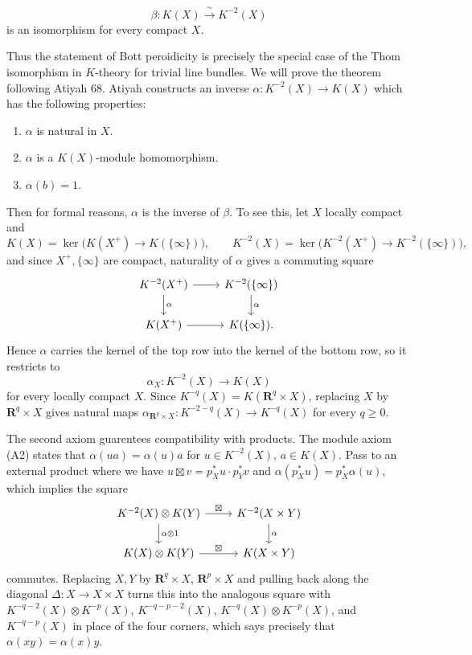 \documentclass[12pt]{article}
\begin{document}
\begin{theorem}
\[
\beta: K(X) \xrightarrow{\ \sim\ } K^{-2}(X)
\]
is an isomorphism for every compact $X$.
\end{theorem}
Thus the statement of Bott peroidicity is precisely the special case of the Thom isomorphism in $K$-theory for trivial line bundles. We will prove the theorem following Atiyah 68. Atiyah constructs an inverse $\alpha: K^{-2}(X) \to K(X)$ which has the following properties:
\begin{enumerate}
    \item $\alpha$ is natural in $X$.
    \item $\alpha$ is a $K(X)$-module homomorphism.
    \item $\alpha(b) = 1$.
\end{enumerate} Then for formal reasons, $\alpha$ is the inverse of $\beta$. To see this, let $X$ locally compact and
\[
K(X)=\ker\big(K(X^+)\to K(\{\infty\})\big),
\qquad
K^{-2}(X)=\ker\big(K^{-2}(X^+)\to K^{-2}(\{\infty\})\big),
\]
and since $X^+,\{\infty\}$ are compact, naturality of $\alpha$ gives a commuting square
\[
\begin{tikzcd}
K^{-2}(X^+) \arrow[r] \arrow[d,"\alpha"] & K^{-2}(\{\infty\}) \arrow[d,"\alpha"] \\
K(X^+) \arrow[r] & K(\{\infty\}).
\end{tikzcd}
\]
Hence $\alpha$ carries the kernel of the top row into the kernel of the bottom row, so it
restricts to
\[
\alpha_X: K^{-2}(X)\longrightarrow K(X)
\]
for every locally compact $X$. Since $K^{-q}(X)=K(\mathbf R^q\times X)$, replacing $X$ by
$\mathbf R^q\times X$ gives natural maps $\alpha_{\mathbf R^q\times X}: K^{-2-q}(X)\longrightarrow K^{-q}(X)$ for every $q\ge 0$.

The second axiom guarentees compatibility with products. The module axiom (A2) states that $\alpha(ua)=\alpha(u)a$ for $u\in K^{-2}(X)$,
$a\in K(X)$. Pass to an external product where we have
$u\boxtimes v = p_X^*u\cdot p_Y^*v$ and $\alpha(p_X^*u)=p_X^*\alpha(u)$, which implies the square
\[
\begin{tikzcd}
K^{-2}(X)\otimes K(Y) \arrow[r,"\boxtimes"] \arrow[d,"\alpha\otimes 1"] & K^{-2}(X\times Y) \arrow[d,"\alpha"] \\
K(X)\otimes K(Y) \arrow[r,"\boxtimes"] & K(X\times Y)
\end{tikzcd}
\]
commutes. Replacing $X,Y$ by $\mathbf R^q\times X$, $\mathbf R^p\times X$ and pulling back
along the diagonal $\Delta:X\to X\times X$ turns this into the analogous square with
$K^{-q-2}(X)\otimes K^{-p}(X)$, $K^{-q-p-2}(X)$, $K^{-q}(X)\otimes K^{-p}(X)$, and
$K^{-q-p}(X)$ in place of the four corners, which says precisely that $\alpha(xy)=\alpha(x)y$.
\end{document}
